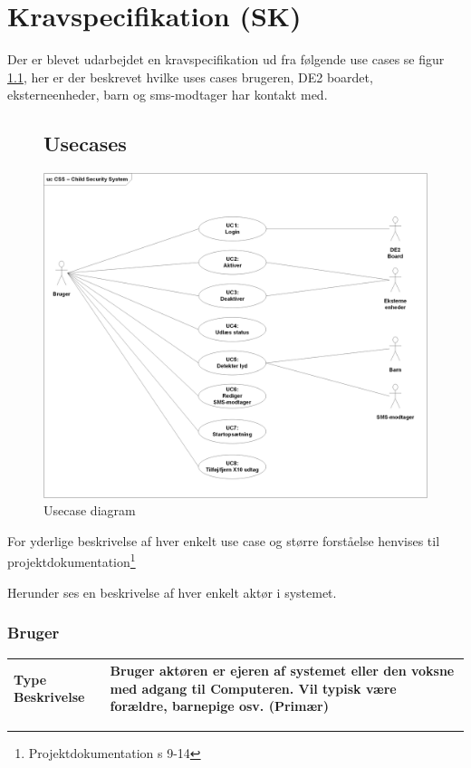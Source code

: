 \chapter{Kravspecifikation (SK)}

Der er blevet udarbejdet en kravspecifikation ud fra følgende use cases se figur \ref{lab:usecasediagram}, her er der beskrevet hvilke uses cases brugeren, DE2 boardet, eksterneenheder, barn og sms-modtager har kontakt med. 

\begin{figure}[!htbp] \centering
\section{Usecases}
\vspace*{\fill}
\includegraphics[width=\textwidth]{billeder/diagrammer/Usecase_Diagram}
\caption{Usecase diagram}
\label{lab:usecasediagram}
\vspace*{\fill}
\end{figure}

For yderlige beskrivelse af hver enkelt use case og større forståelse henvises til projektdokumentation\footnote{Projektdokumentation s 9-14}
\newpage

Herunder ses en beskrivelse af hver enkelt aktør i systemet.

\begin{table}[!htbp] \centering
\subsection{Bruger}
\begin{tabular}{|p{4cm}|p{8cm}|}
	\hline
		\textbf{Type Beskrivelse} &
			Bruger aktøren er ejeren af systemet eller den voksne med adgang til Computeren. 
			Vil typisk være forældre, barnepige osv. (Primær) \\\hline
	\end{tabular}
\end{table}

